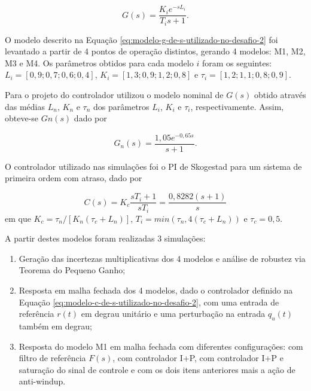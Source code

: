 \begin{equation}
    \label{eq:modelo-g-de-s-utilizado-no-desafio-2}
    G(s) = \frac{K_{i}e^{-sL_{i}}}{T_{i}s + 1}.
\end{equation}

O modelo descrito na Equação \ref{eq:modelo-g-de-s-utilizado-no-desafio-2} foi
levantado a partir de 4 pontos de operação distintos, gerando 4 modelos: M1, M2,
M3 e M4. Os parâmetros obtidos para cada modelo $i$ foram os seguintes: $L_{i} =
[0,9; 0,7; 0,6; 0,4]$, $K_{i} = [1,3; 0,9; 1,2; 0,8]$ e $\tau_{i} = [1,2; 1,1;
0,8; 0,9]$.

Para o projeto do controlador utilizou o modelo nominal de $G(s)$ obtido
através das médias $L_{n}$, $K_{n}$ e $\tau_{n}$ dos parâmetros $L_{i}$, $K_{i}$
e $\tau_{i}$, respectivamente. Assim, obteve-se $G{n}(s)$ dado por

\begin{equation}
    \label{eq:modelo-gn-de-s-utilizado-no-desafio-2}
    G_{n}(s) = \frac{1,05e^{-0,65s}}{s + 1}.
\end{equation}

O controlador utilizado nas simulações foi o PI de Skogestad para um sistema de
primeira ordem com atraso, dado por

\begin{equation}
    \label{eq:modelo-c-de-s-utilizado-no-desafio-2}
    C(s) = K_{c}\frac{sT_{i} + 1}{sT_{i}} = \frac{0,8282(s + 1)}{s}
\end{equation}
em que $K_{c} = \tau_{n}/[K_{n}(\tau_{c} + L_{n})]$, $T_{i} = min(\tau_{n},
4(\tau_{c} + L_{n}))$ e $\tau_{c} = 0,5$. 

A partir destes modelos foram realizadas 3 simulações:
\begin{enumerate}
    \item Geração das incertezas multiplicativas dos 4 modelos e análise de
    robustez via Teorema do Pequeno Ganho;
    \item Resposta em malha fechada dos 4 modelos, dado o controlador definido
    na Equação \ref{eq:modelo-c-de-s-utilizado-no-desafio-2}, com uma entrada de
    referência $r(t)$ em degrau unitário e uma perturbação na entrada $q_{u}(t)$
    também em degrau;
    \item Resposta do modelo M1 em malha fechada com diferentes configurações:
    com filtro de referência $F(s)$, com controlador I+P, com controlador I+P e
    saturação do sinal de controle e com os dois itens anteriores mais a ação de
    anti-windup.
\end{enumerate}

